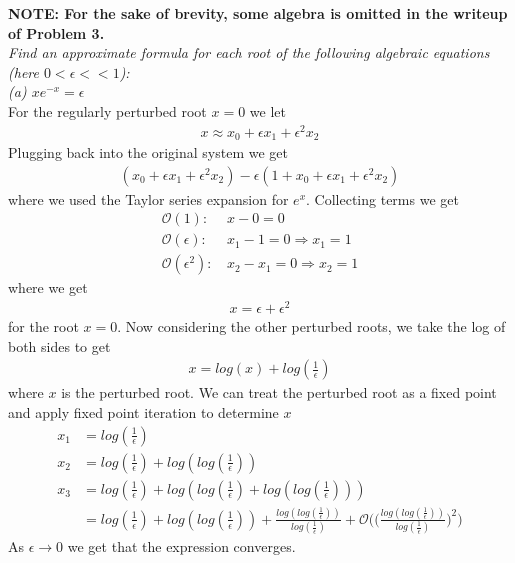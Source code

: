 \documentclass[12pt]{article}
\theoremstyle{remark}
\begin{document}
\textbf{NOTE: For the sake of brevity, some algebra is omitted in the writeup of Problem 3.} \\ 

\textit{Find an approximate formula for each root of the following algebraic equations (here $0 < \epsilon << 1$):} \\

\textit{(a) $xe^{-x} = \epsilon$} \\ 

For the regularly perturbed root  $x = 0$ we let 
\begin{align*}
	x \approx x_0 + \epsilon x_1 + \epsilon^2 x_2
\end{align*}
Plugging back into the original system we get
\begin{align*}
	(x_0 + \epsilon x_1 + \epsilon^2 x_2) - \epsilon(1 + x_0 + \epsilon x_1 + \epsilon^2 x_2)
\end{align*}
where we used the Taylor series expansion for $e^x$. Collecting terms we get
\begin{align*}
	\mathcal{O}(1): & \, x-0 = 0 \\
	\mathcal{O}(\epsilon): & \, x_1 - 1 = 0 \Rightarrow x_1 = 1 \\
	\mathcal{O}(\epsilon^2): & \, x_2 - x_1 = 0 \Rightarrow x_2 = 1
\end{align*}
where we get 
\begin{align*}
	x = \epsilon + \epsilon^2
\end{align*}
for the root $x = 0$. Now considering the other perturbed roots, we take the log of both sides to get 
\begin{align*}
	x = log(x) + log(\frac{1}{\epsilon})
\end{align*}
where $x$ is the perturbed root. We can treat the perturbed root as a fixed point and apply fixed point iteration to determine $x$
\begin{align*}
	x_1 & = log(\frac{1}{\epsilon}) \\
	x_2 & = log(\frac{1}{\epsilon}) + log(log(\frac{1}{\epsilon})) \\
	x_3 & = log(\frac{1}{\epsilon}) + log(log(\frac{1}{\epsilon}) + log(log(\frac{1}{\epsilon}))) \\
	& = log(\frac{1}{\epsilon}) + log(log(\frac{1}{\epsilon})) + \frac{log(log(\frac{1}{\epsilon}))}{log(\frac{1}{\epsilon})} + \mathcal{O}\bigg(\bigg(\frac{log(log(\frac{1}{\epsilon}))}{log(\frac{1}{\epsilon})}\bigg)^2\bigg)
\end{align*}
As $\epsilon \rightarrow 0$ we get that the expression converges. 
\end{document}
